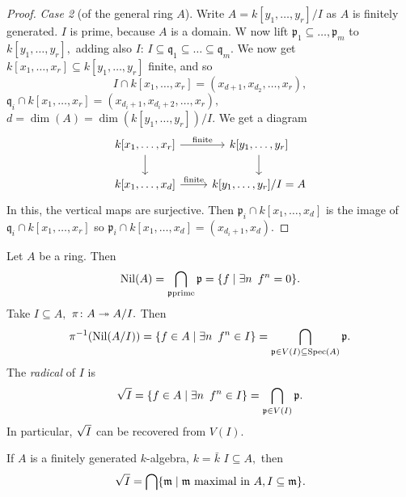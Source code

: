 \begin{proof}
  \emph{Case 2} (of the general ring \(A\)).
  Write
  \(A = k[y_1, \dotsc, y_r]/{I}\)
  as \(A\) is finitely generated.
  \(I\) is prime, because \(A\) is a domain.
  W now lift
  \(\mathfrak p_1 \subseteq \dotsc, \mathfrak p_m\)
  to \(k[y_1, \dotsc, y_r],\) adding also \(I\):
  \(I \subseteq \mathfrak q_1 \subseteq \dotso \subseteq \mathfrak q_m.\)
  We now get
  \(k[x_1, \dotsc, x_r] \subseteq k[y_1, \dotsc, y_r]\) finite, and so
  \[I \cap k[x_1, \dotsc, x_r] = (x_{d+1}, x_{d_2}, \dotsc, x_r),\]
  \(\mathfrak q_i \cap k[x_1, \dotsc, x_r] = (x_{d_i+1}, x_{d_i+2}, \dotsc, x_r),\)
  \(d = \dim(A) = \dim(k[y_1, \dotsc, y_r])/{I}.\)
  We get a diagram
  \begin{equation*}
    \begin{tikzcd}
      k[x_1, \dotsc, x_r] \arrow{r}{\text{finite}} \arrow{d}
      & k[y_1, \dotsc, y_r] \arrow{d} \\
      k[x_1, \dotsc, x_d] \arrow{r}{\text{finite}}
      & k[y_1, \dotsc, y_r]/{I} = A
    \end{tikzcd}
  \end{equation*}
  In this, the vertical maps are surjective.
  Then
  \(\mathfrak p_i \cap k[x_1, \dotsc, x_d]\) is the image of \(\mathfrak q_i \cap k[x_1, \dotsc, x_r]\)
  so
  \(\mathfrak p_i \cap k[x_1, \dotsc, x_d] = (x_{d_i+1}, x_{d}).\)
\end{proof}


\begin{note}
  Let \(A\) be a ring. Then
  \[\operatorname{Nil}(A) = \bigcap_{\mathfrak p \text{prime}} \mathfrak p = \{f \mathrel{|} \exists n \enspace f^n = 0\}.\]
  Take \(I \subseteq A,\) \(\pi \colon A \twoheadrightarrow A/{I}.\)
  Then
  \[\pi^{-1}(\operatorname{Nil}(A/{I})) = \{f \in A \mathrel{|} \exists n \enspace f^n \in I\} = \bigcap_{\mathfrak p \in V(I) \subseteq \text{Spec}(A)} \mathfrak p.\]
  The \emph{radical} of \(I\) is
  \[\sqrt{I} = \{f \in A \mathrel{|} \exists n \enspace f^n \in I\} = \bigcap_{\mathfrak p \in V(I)} \mathfrak p.\]
  In particular, \(\sqrt{I}\) can be recovered from \(V(I).\)
\end{note}

\begin{theorem}[Nullstellensatz]
  \label{Nullstellensatz}
  If \(A\) is a finitely generated \(k\)-algebra, \(k = \bar k\) \(I \subseteq A,\) then
  \[\sqrt{I} = \bigcap \{\mathfrak m \mathrel{|} \mathfrak m \text{ maximal in \(A\)}, I \subseteq \mathfrak{ m}\}.\]
\end{theorem}


